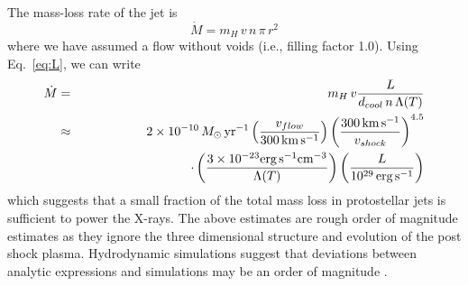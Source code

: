 The mass-loss rate of the jet is 
\begin{equation}
\dot{M} = m_H\,v\,n\,\pi\,r^2
\end{equation}
where we have assumed a flow without voids (i.e., filling factor 1.0). Using Eq.~\ref{eq:L}, 
we can write
\begin{eqnarray}
\dot{M} & = &  m_H\,v \frac{L}{d_{cool}\, n\,\Lambda(T)}\\%
        & \approx & 2\times10^{-10} \,M_\odot\,\textrm{yr}^{-1} \left( \frac{v_{flow}}{300\,\textrm{km}\,\textrm{s}^{-1}} \right) \left( \frac{300\,\textrm{km}\,\textrm{s}^{-1}}{v_{shock}} \right)^{4.5} \nonumber \\
        && \hspace*{3cm}\cdot \left(\frac{3\times10^{-23} \textrm{erg}\, \textrm{s}^{-1} \textrm{cm}^{-3}}{\Lambda(T)}\right)  \left( \frac{L}{10^{29}\,\textrm{erg}\,\textrm{s}^{-1}} \right)
\end{eqnarray}
which suggests that a small fraction of the total mass loss in protostellar jets is sufficient to power the X-rays. 
The above estimates are rough order of magnitude estimates as they ignore the three dimensional structure and evolution of the post shock plasma. Hydrodynamic simulations suggest that deviations between analytic expressions and simulations may be an order of magnitude \citep{Raga_2002}. 

